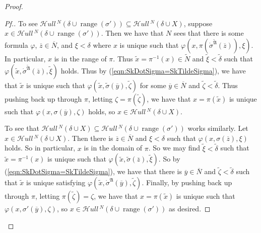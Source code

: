 \documentclass{amsart}
\theoremstyle{definition}
\theoremstyle{remark}
\newcommand{\N}{{\overline{N}}}
\DeclareMathOperator{\ran}{range}
\newcommand{\SH}{\mathcal{H}\textit{ull} \,}
\newcommand{\sk}[3]{\SH^{#1}( {#2} \cup {\ran(#3)} ) }
\newcommand{\Sk}[3]{\SH^{#1}( {#2} \cup {#3} ) }
\begin{document}
\begin{proof}
\begin{proof}[Pf.]
To see $\sk{N}{\delta}{\sigma'} \subseteq \Sk{N}{\delta}{X}$, suppose $x \in \sk{N}{\delta}{\sigma'}$. Then we have that $N$ sees that there is some formula $\varphi$, $\overline z \in \N$, and $\xi < \delta$ where $x$ is unique such that $\varphi(x, \pi(\dot \sigma^{\tilde{\mathfrak A}}(\overline z)), \xi)$. In particular, $x$ is in the range of $\pi$. Thus $\tilde x = \pi^{-1}(x) \in \tilde N$ and $\tilde \xi < \tilde \delta$ such that $\varphi(\tilde x, \dot \sigma^{\tilde{\mathfrak A}}(\overline z), \tilde \xi)$ holds. Thus by (\ref{eqn:SkDotSigma=SkTildeSigma}), we have that $\tilde x$ is unique such that 
$\varphi(\tilde x, \tilde \sigma(\overline y), \tilde \zeta)$ for some $\overline y \in \N$ and $\tilde \zeta < \tilde \delta$. Thus pushing back up through $\pi$, letting $\zeta = \pi(\tilde \zeta)$, we have that $x = \pi(\tilde x)$ is unique such that $\varphi(x, \sigma(\overline y), \zeta)$ holds, so $x \in \Sk{N}{\delta}{X}$.

To see that $\Sk{N}{\delta}{X} \subseteq \sk{N}{\delta}{\sigma'}$ works similarly. Let $x \in \Sk{N}{\delta}{X}$. Then there is $\overline z \in \N$ and $\xi < \delta$ such that $\varphi(x, \sigma(\overline z), \xi)$ holds. So in particular, $x$ is in the domain of $\pi$. So we may find $\tilde \xi < \tilde \delta$ such that $\tilde x = \pi^{-1}(x)$ is unique such that $\varphi(\tilde x, \tilde \sigma(\overline z), \tilde \xi)$. So by (\ref{eqn:SkDotSigma=SkTildeSigma}), we have that there is $\overline y \in \N$ and $\tilde \zeta < \tilde \delta$ such that $\tilde x$ is unique satisfying $\varphi(\tilde x, \dot{\sigma}^{\mathfrak A}(\overline y), \tilde \zeta)$. Finally, by pushing back up through $\pi$, letting $\pi(\tilde \zeta) = \zeta$, we have that $x = \pi(\tilde x)$ is unique such that $\varphi(x, \sigma'(\overline y), \zeta)$, so $x \in \sk{N}{\delta}{\sigma'}$ as desired.



\end{proof}
\end{proof}
\end{document}
